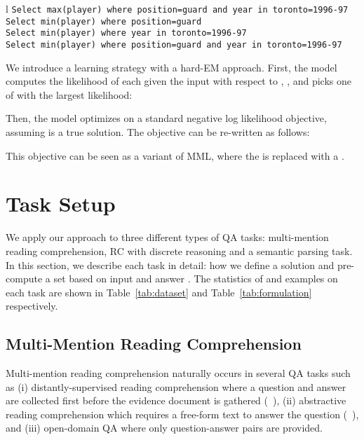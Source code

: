 \documentclass[11pt,a4paper]{article}
\begin{document}
\begin{table*}[tb]
\begin{tabulary}{\textwidth}{l}
        \texttt{Select max(player) where position=guard and year in toronto=1996-97} \\ \texttt{Select min(player) where position=guard} \\
        \texttt{Select min(player) where year in toronto=1996-97} \\
        \texttt{Select min(player) where position=guard and year in toronto=1996-97} \\
     \bottomrule
\end{tabulary}
\caption{
    Examples of the input, answer text (), ,  and . First, in multi-mention reading comprehension, the answer text `Robert Schumann' is mentioned six times but only the fourth span is related to the question. Second, in reading comprehension with discrete reasoning, many equations yield to the answer 4, but only `40-37' answers the question. Lastly, in SQL query generation, five SQL queries lead to the answer but only the first one is the correct query.
See Section~\ref{sec:setup} for more details.
} 
\label{tab:formulation}
\vspace{-8pt}
\end{table*}


 
We introduce a learning strategy with a hard-EM approach. First, the model computes the likelihood of each  given the input  with respect to , , and picks one of  with the largest likelihood:

Then, the model optimizes on a standard negative log likelihood objective, assuming  is a true solution. The objective can be re-written as follows:


\noindent
This objective can be seen as a variant of MML, where the  is replaced with a .

 \section{Task Setup}\label{sec:setup}
We apply our approach to three different types of QA tasks: multi-mention reading comprehension, RC with discrete reasoning and a semantic parsing task. In this section, we describe each task in detail: how we define a solution  and pre-compute a set  based on input  and answer . The statistics of  and examples on each task are shown in Table~\ref{tab:dataset} and Table~\ref{tab:formulation} respectively.


\subsection{Multi-Mention Reading Comprehension}\label{subsec:dsr}
Multi-mention reading comprehension naturally occurs in several QA tasks such as (i) distantly-supervised reading comprehension where a question and answer are collected first before the evidence document is gathered (\eg\ \trivia), (ii) abstractive reading comprehension which requires a free-form text to answer the question (\eg\ \narrative), and (iii) open-domain QA where only question-answer pairs are provided.
\end{document}
